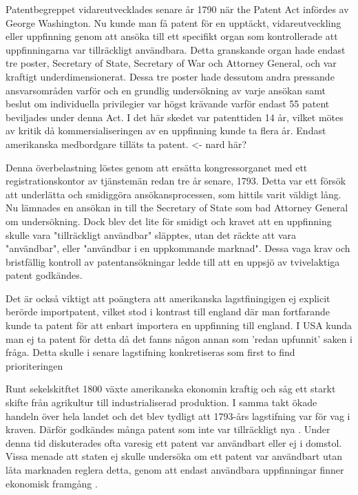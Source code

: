 Patentbegreppet vidareutvecklades senare år 1790 när the Patent Act infördes av George Washington. Nu
kunde man få patent för en upptäckt, vidareutveckling eller uppfinning genom att ansöka till ett
specifikt organ som kontrollerade att uppfinningarna var tillräckligt användbara\cite{nard}. Detta
granskande organ hade endast tre poster, Secretary of State, Secretary of War och Attorney General, och
var kraftigt underdimensionerat. Dessa tre poster hade dessutom andra pressande ansvarsområden varför
och en grundlig undersökning av varje ansökan samt beslut om individuella privilegier var högst krävande varför endast 55 patent beviljades under denna Act\cite{nard}.  I det här skedet var patenttiden 14 år, vilket
mötes av kritik då kommersialiseringen av en uppfinning kunde ta flera år. Endast amerikanska
medbordgare tilläts ta patent\cite{nard}. <- nard här? 

Denna överbelastning löstes genom att ersätta kongressorganet med ett registrationskontor
av tjänstemän redan tre år senare, 1793. Detta var ett försök att underlätta och smidiggöra
ansökansprocessen, som hittils varit väldigt lång. Nu lämnades en ansökan in till the Secretary of State
som bad Attorney General om undersökning. Dock blev det lite för smidigt och kravet att en uppfinning
skulle vara "tillräckligt användbar" släpptes, utan det räckte att vara "användbar", eller "användbar i
en uppkommande marknad". Dessa vaga krav och bristfällig kontroll av patentansökningar ledde till att en
uppsjö av tvivelaktiga patent godkändes\cite{nard}. 

Det är också viktigt att poängtera att amerikanska lagstfiningigen ej explicit berörde importpatent, vilket stod i kontrast till england där man fortfarande kunde ta patent för att enbart importera en uppfinning till england\cite{bracha}. I USA kunda man ej ta patent för detta då det fanns någon annan som 'redan upfunnit' saken i fråga. Detta skulle i senare lagstifning konkretiseras som first to find prioriteringen

Runt sekelskitftet 1800 växte amerikanska ekonomin kraftig och såg ett starkt skifte från agrikultur
till industrialiserad produktion. I samma takt ökade handeln över hela landet och det blev tydligt att 1793-års lagstifning var för vag i kraven. Därför godkändes många patent som inte var tillräckligt nya \cite{nard}. Under denna tid diskuterades ofta varesig ett patent var användbart eller ej i domstol. Vissa menade att staten ej skulle undersöka om ett patent var användbart utan låta marknaden reglera detta, genom att endast användbara uppfinningar finner ekonomisk framgång \cite{bracha}.

